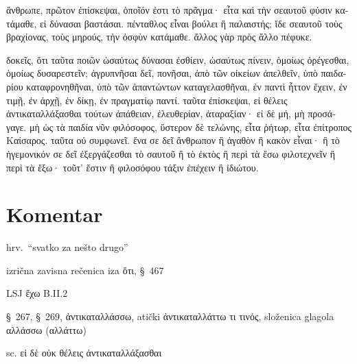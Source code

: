 {\large

\begin{greek}

\noindent ἄνθρωπε, πρῶτον ἐπίσκεψαι, ὁποῖόν ἐστι τὸ πρᾶγμα· εἶτα καὶ τὴν σεαυτοῦ φύσιν κατάμαθε, εἰ δύνασαι βαστάσαι. πένταθλος εἶναι βούλει ἢ παλαιστής; ἴδε σεαυτοῦ τοὺς βραχίονας, τοὺς μηρούς, τὴν ὀσφὺν κατάμαθε. ἄλλος γὰρ πρὸς ἄλλο πέφυκε. 

δοκεῖς, ὅτι ταῦτα ποιῶν ὡσαύτως δύνασαι ἐσθίειν, ὡσαύτως πίνειν, ὁμοίως ὀρέγεσθαι, ὁμοίως δυσαρεστεῖν; ἀγρυπνῆσαι δεῖ, πονῆσαι, ἀπὸ τῶν οἰκείων ἀπελθεῖν, ὑπὸ παιδαρίου καταφρονηθῆναι, ὑπὸ τῶν ἀπαντώντων καταγελασθῆναι, ἐν παντὶ ἧττον ἔχειν, ἐν τιμῇ, ἐν ἀρχῇ, ἐν δίκῃ, ἐν πραγματίῳ παντί. ταῦτα ἐπίσκεψαι, εἰ θέλεις ἀντικαταλλάξασθαι τούτων ἀπάθειαν, ἐλευθερίαν, ἀταραξίαν· εἰ δὲ μή, μὴ προσάγαγε. μὴ ὡς τὰ παιδία νῦν φιλόσοφος, ὕστερον δὲ τελώνης, εἶτα ῥήτωρ, εἶτα ἐπίτροπος Καίσαρος. ταῦτα οὐ συμφωνεῖ. ἕνα σε δεῖ ἄνθρωπον ἢ ἀγαθὸν ἢ κακὸν εἶναι· ἢ τὸ ἡγεμονικόν σε δεῖ ἐξεργάζεσθαι τὸ σαυτοῦ ἢ τὸ ἐκτὸς ἢ περὶ τὰ ἔσω φιλοτεχνεῖν ἢ περὶ τὰ ἔξω· τοῦτ' ἔστιν ἢ φιλοσόφου τάξιν ἐπέχειν ἢ ἰδιώτου.

\end{greek}

}


\section*{Komentar}






\begin{description}[noitemsep]
\item[ἄλλος\dots\ πρὸς ἄλλο] hrv.\ ``svatko za nešto drugo''
\end{description}


\begin{description}[noitemsep]
\item[δοκεῖς, ὅτι\dots] izrična zavisna rečenica iza ὅτι, §~467
\end{description}


\begin{description}[noitemsep]
\item[ἧττον ἔχειν] LSJ ἔχω B.II.2
\end{description}


\begin{description}[noitemsep]
\item[ἀντικαταλλάξασθαι] §~267, §~269, ἀντικαταλλάσσω, atički ἀντικαταλλάττω τι τινός, složenica glagola αλλάσσω (αλλάττω)
\item[εἰ δὲ μή] sc. \textgreek[variant=ancient]{εἰ δὲ οὐκ θέλεις ἀντικαταλλάξασθαι}
\end{description}

